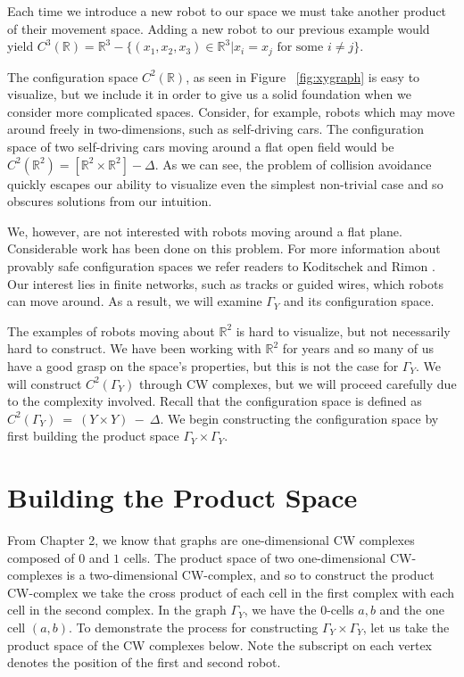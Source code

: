 \documentclass{amsart}
\newcommand{\R}{\mathbb{R}}
\newcommand{\Y}{\Gamma_Y}
\begin{document}
Each time we introduce a new robot to our space we must take another product of their movement space. Adding a new robot to our previous example would yield $C^3(\R)=\R^3 - \{(x_1,x_2,x_3)\in \R^3|x_i=x_j \text{ for some } i \neq j\}$. 

The configuration space $C^2(\R)$, as seen in Figure~
\ref{fig:xygraph} is easy to visualize, but we include it in order to give us a solid foundation when we consider more complicated spaces. Consider, for example,  robots which may move around freely in two-dimensions, such as self-driving cars. The configuration space of two self-driving cars moving around a flat open field would be $C^2(\R^2)= [\R^2 \times \R^2]-\Delta$. As we can see, the problem of collision avoidance quickly escapes our ability to visualize even the simplest non-trivial case and so obscures solutions from our intuition. 

We, however, are not interested with robots moving around a flat plane. Considerable work has been done on this problem. For more information about provably safe configuration spaces we refer readers to Koditschek and Rimon \cite{safe}. Our interest lies in finite networks, such as tracks or guided wires, which robots can move around. As a result, we will examine $\Y$ and its configuration space.

The examples of robots moving about $\R^2$ is hard to visualize, but not necessarily hard to construct. We have been working with $\R^2$ for years and so many of us have a good grasp on the space's properties, but this is not the case for $\Y$. We will construct $C^2(\Y)$ through CW complexes, but we will proceed carefully due to the complexity involved. Recall that the configuration space is defined as $C^2(\Y)~=~(Y\times Y)~-~\Delta$. We begin constructing the configuration space by first building the product space $\Y \times \Y$.

\section{Building the Product Space}

From Chapter 2, we know that graphs are one-dimensional CW complexes composed of $0$ and $1$ cells. The product space of two one-dimensional CW-complexes is a two-dimensional CW-complex, and so to construct the product CW-complex we take the cross product of each cell in the first complex with each cell in the second complex. In the graph $\Y$, we have the $0$-cells $a,b$ and the one cell $(a,b)$. To demonstrate the process for constructing $\Y \times \Y$, let us take the product space of the CW complexes below. Note the subscript on each vertex denotes the position of the first and second robot. 
\end{document}

